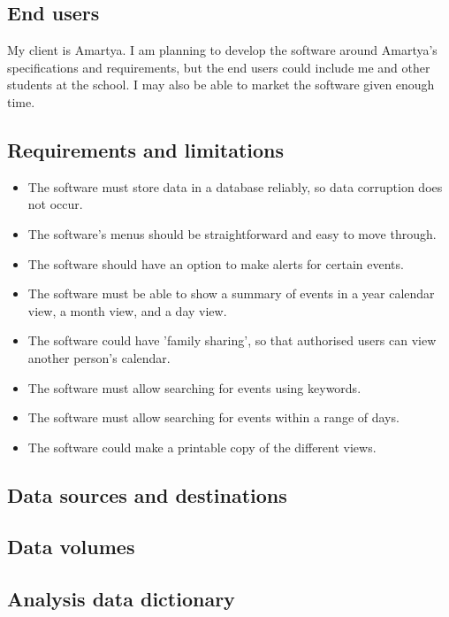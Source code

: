 \subsection{End users}

My client is Amartya. I am planning to develop the software around Amartya's
specifications and requirements, but the end users could include me and other
students at the school. I may also be able to market the software given enough
time.


\subsection{Requirements and limitations}

\begin{itemize}
  \item The software must store data in a database reliably, so data
        corruption does not occur.
  \item The software's menus should be straightforward and easy to move
        through.
  \item The software should have an option to make alerts for certain
        events.
  \item The software must be able to show a summary of events in a year
        calendar view, a month view, and a day view.
  \item The software could have 'family sharing', so that authorised
        users can view another person's calendar.
  \item The software must allow searching for events using keywords.
  \item The software must allow searching for events within a range of
        days.
  \item The software could make a printable copy of the different views.
\end{itemize}


\subsection{Data sources and destinations}
\lipsum
\subsection{Data volumes}
\lipsum
\subsection{Analysis data dictionary}

